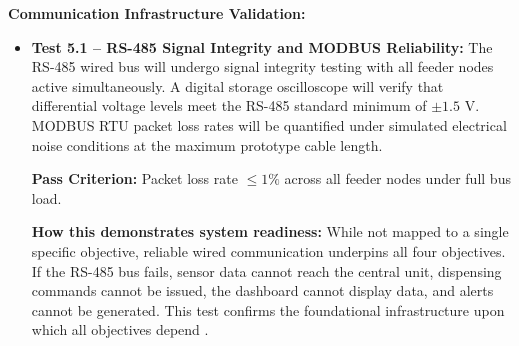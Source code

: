 \textbf{Communication Infrastructure Validation:}
\begin{itemize}
  \item \textbf{Test 5.1 -- RS-485 Signal Integrity and MODBUS Reliability:} The RS-485 wired bus will undergo signal integrity testing with all feeder nodes active simultaneously. A digital storage oscilloscope will verify that differential voltage levels meet the RS-485 standard minimum of $\pm 1.5$ V. MODBUS RTU packet loss rates will be quantified under simulated electrical noise conditions at the maximum prototype cable length.

    \textbf{Pass Criterion:} Packet loss rate $\leq 1\%$ across all feeder nodes under full bus load.

    \textbf{How this demonstrates system readiness:} While not mapped to a single specific objective, reliable wired communication underpins all four objectives. If the RS-485 bus fails, sensor data cannot reach the central unit, dispensing commands cannot be issued, the dashboard cannot display data, and alerts cannot be generated. This test confirms the foundational infrastructure upon which all objectives depend \cite{beyondtech2025smart,adeoye2025animalia}.
\end{itemize}

